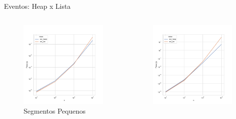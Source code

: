 \documentclass[aspectratio=169,usenames,dvipsnames]{beamer}
\begin{document}
\begin{frame}{ Eventos: Heap x Lista}

   \begin{columns}
    \begin{column}{0.4\textwidth}
      \begin{figure}
        \includegraphics[width=\textwidth]{figs/tempos/heap_x_list_small.pdf}
        \caption{Segmentos Pequenos}
      \end{figure}
    \end{column}
    \begin{column}{0.4\textwidth}
      \begin{figure}
        \centering
        \includegraphics[width=\textwidth]{figs/tempos/heap_x_list_big.pdf}

\end{figure}
\end{column}
\end{columns}
\end{frame}
\end{document}
